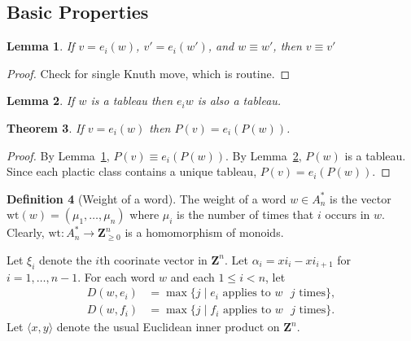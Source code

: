 \documentclass[12pt]{amsart}
\newcommand{\wt}{\mathrm{wt}}
\newcommand{\ip}[2]{\langle#1,#2\rangle}
\newtheorem{theorem}{Theorem}[subsection]
\newtheorem{lemma}[theorem]{Lemma}
\theoremstyle{definition}
\newtheorem{definition}[theorem]{Definition}
\theoremstyle{example}
\begin{document}
\subsection{Basic Properties}
\label{sec:basic-properties}
\begin{lemma}
  \label{lemma:knuth-plactic}
  If $v=e_i(w)$, $v'=e_i(w')$, and $w\equiv w'$, then $v\equiv v'$
\end{lemma}
\begin{proof}
  Check for single Knuth move, which is routine.
\end{proof}
\begin{lemma}
  \label{lemma:tab2tab}
  If $w$ is a tableau then $e_iw$ is also a tableau.
\end{lemma}
\begin{theorem}
  If $v=e_i(w)$ then $P(v)=e_i(P(w))$.
\end{theorem}
\begin{proof}
  By Lemma~\ref{lemma:knuth-plactic}, $P(v)\equiv e_i(P(w))$.
  By Lemma~\ref{lemma:tab2tab}, $P(w)$ is a tableau.
  Since each plactic class contains a unique tableau, $P(v)=e_i(P(w))$.
\end{proof}
\begin{definition}
  [Weight of a word]
  The weight of a word $w\in A_n^*$ is the vector $\wt(w)=(\mu_1,\dotsc,\mu_n)$ where $\mu_i$ is the number of times that $i$ occurs in $w$.
  Clearly, $\wt:A_n^*\to \mathbf Z_{\geq 0}^n$ is a homomorphism of monoids.
\end{definition}
Let $\xi_i$ denote the $i$th coorinate vector in $\mathbf Z^n$.
Let $\alpha_i=xi_i-xi_{i+1}$ for $i=1,\dotsc,n-1$.
For each word $w$ and each $1\leq i<n$, let
\begin{align*}
  D(w,e_i)&=\max\{j\mid e_i \text{ applies to $w$ $j$ times}\},\\
  D(w,f_i)&=\max\{j\mid f_i \text{ applies to $w$ $j$ times}\}.
\end{align*}
Let $\ip xy$ denote the usual Euclidean inner product on $\mathbf Z^n$.
\end{document}
